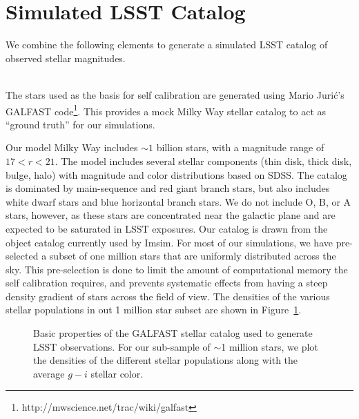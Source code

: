 \documentclass[12pt,preprint]{aastex}
\begin{document}
\section{Simulated LSST Catalog}


We combine the following elements to generate a simulated LSST catalog of observed stellar magnitudes.

\\
The stars used as the basis for self calibration are generated using Mario Juri\'{c}'s GALFAST code\footnote{ http://mwscience.net/trac/wiki/galfast}.  This provides a mock Milky Way stellar catalog to act as ``ground truth'' for our simulations.  

Our model Milky Way includes $\sim1$ billion stars, with a magnitude range of $17 < r < 21$.  The model includes several stellar components (thin disk, thick disk, bulge, halo) with magnitude and color distributions based on SDSS. The catalog is dominated by main-sequence and red giant branch stars, but also includes white dwarf stars and blue horizontal branch stars.  We do not include O, B, or A stars, however, as these stars are concentrated near the galactic plane and are expected to be saturated in LSST exposures.  Our catalog is drawn from the object catalog currently used by Imsim.  For most of our simulations, we have pre-selected a subset of one million stars that are uniformly distributed across the sky.  This pre-selection is done to limit the amount of computational memory the self calibration requires, and prevents systematic effects from having a steep density gradient of stars across the field of view.  The densities of the various stellar populations in out 1 million star subset are shown in Figure~\ref{fig:gfpop}.


\begin{figure}
\caption{Basic properties of the GALFAST stellar catalog used to generate LSST observations.  For our sub-sample of $\sim$1 million stars, we plot the densities of the different stellar populations along with the average $g-i$ stellar color.\label{fig:gfpop}}
\end{figure}
\end{document}

